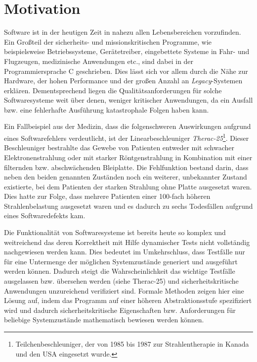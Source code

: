 \section{Motivation}

Software ist in der heutigen Zeit in nahezu allen Lebensbereichen vorzufinden. Ein Großteil der sicherheits- und missionskritischen Programme, wie beispielsweise Betriebssysteme, Gerätetreiber, eingebettete Systeme in Fahr- und Flugzeugen, medizinische Anwendungen etc.,  sind dabei in der Programmiersprache C geschrieben. Dies lässt sich vor allem durch die Nähe zur Hardware, der hohen Performance und der großen Anzahl an \emph{Legacy}-Systemen erklären. Dementsprechend liegen die Qualitätsanforderungen für solche Softwaresysteme weit über denen, weniger kritischer Anwendungen, da ein Ausfall bzw. eine fehlerhafte Ausführung katastrophale Folgen haben kann.

Ein Fallbeispiel aus der Medizin, dass die folgenschweren Auswirkungen aufgrund eines Softwarefehlers verdeutlicht, ist der Linearbeschleuniger \emph{Therac-25}\footnote{Teilchenbeschleuniger, der von 1985 bis 1987 zur Strahlentherapie in Kanada und den USA eingesetzt wurde.}. Dieser Beschleuniger bestrahlte das Gewebe von Patienten entweder mit schwacher Elektronenstrahlung oder mit starker Röntgenstrahlung in Kombination mit einer filternden bzw. abschwächenden Bleiplatte. Die Fehlfunktion bestand darin, dass neben den beiden genannten Zuständen noch ein weiterer, unbekannter Zustand existierte, bei dem Patienten der starken Strahlung ohne Platte ausgesetzt waren. Dies hatte zur Folge, dass mehrere Patienten einer 100-fach höheren Strahlenbelastung ausgesetzt waren und es dadurch zu sechs Todesfällen aufgrund eines Softwaredefekts kam. \cite{Pfeifer2003}

Die Funktionalität von Softwaresysteme ist bereits heute so komplex und weitreichend das deren Korrektheit mit Hilfe dynamischer Tests nicht vollständig nachgewiesen werden kann. Dies bedeutet im Umkehrschluss, dass Testfälle nur für eine Untermenge der möglichen Systemzustände generiert und ausgeführt werden können. Dadurch steigt die Wahrscheinlichkeit das wichtige Testfälle ausgelassen bzw. übersehen werden (siehe Therac-25) und sicherheitskritische Anwendungen unzureichend verifiziert sind. Formale Methoden zeigen hier eine Lösung auf, indem das Programm auf einer höheren Abstraktionsstufe spezifiziert wird und dadurch sicherheitskritische Eigenschaften bzw. Anforderungen für beliebige Systemzustände mathematisch bewiesen werden können. \cite{Crocker2007}
